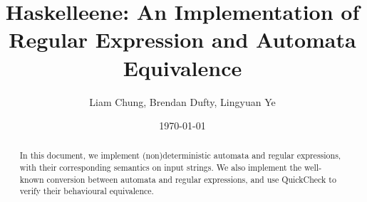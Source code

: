 \documentclass[12pt]{article}
\title{Haskelleene: An Implementation of Regular Expression and Automata Equivalence}
\author{Liam Chung, Brendan Dufty, Lingyuan Ye}
\date{\today}
\begin{document}
\maketitle

\begin{abstract}
  In this document, we implement (non)deterministic automata and regular expressions, with their corresponding semantics on input strings. We also implement the well-known conversion between automata and regular expressions, and use QuickCheck to verify their behavioural equivalence.
\end{abstract}

\vfill

\tableofcontents

\clearpage


% 















\end{document}

